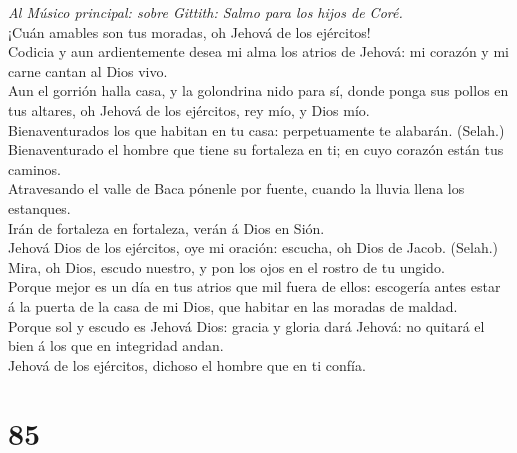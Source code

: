  \emph{Al Músico principal: sobre Gittith: Salmo para los
hijos de Coré.}\\
¡Cuán amables son tus moradas, oh Jehová de los ejércitos!\\
 Codicia y aun ardientemente desea mi alma los atrios de
Jehová: mi corazón y mi carne cantan al Dios vivo.\\
 Aun el gorrión halla casa, y la golondrina nido para sí,
donde ponga sus pollos en tus altares, oh Jehová de los ejércitos, rey
mío, y Dios mío.\\
 Bienaventurados los que habitan en tu casa: perpetuamente
te alabarán. (Selah.)\\
 Bienaventurado el hombre que tiene su fortaleza en ti; en
cuyo corazón están tus caminos.\\
 Atravesando el valle de Baca pónenle por fuente, cuando la
lluvia llena los estanques.\\
 Irán de fortaleza en fortaleza, verán á Dios en Sión.\\
 Jehová Dios de los ejércitos, oye mi oración: escucha, oh
Dios de Jacob. (Selah.)\\
 Mira, oh Dios, escudo nuestro, y pon los ojos en el rostro
de tu ungido.\\
 Porque mejor es un día en tus atrios que mil fuera de
ellos: escogería antes estar á la puerta de la casa de mi Dios, que
habitar en las moradas de maldad.\\
 Porque sol y escudo es Jehová Dios: gracia y gloria dará
Jehová: no quitará el bien á los que en integridad andan.\\
 Jehová de los ejércitos, dichoso el hombre que en ti
confía.

\hypertarget{section-84}{%
\section{85}\label{section-84}}

